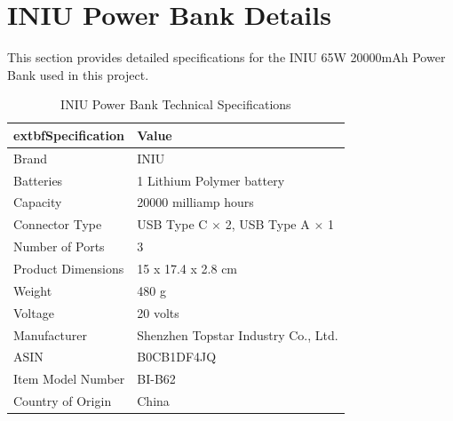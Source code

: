 \section{INIU Power Bank Details}\label{sec:iniu_details}
This section provides detailed specifications for the INIU 65W 20000mAh Power Bank used in this project.
\begin{table}[htbp]
	\centering
	\caption{INIU Power Bank Technical Specifications}
	\label{tab:iniu_power_bank_specs}
	\begin{tabular}{|l|l|}
		\hline
			extbf{Specification} & \textbf{Value} \\
		\hline
		Brand & INIU \\
		\hline
		Batteries & 1 Lithium Polymer battery \\
		\hline
		Capacity & 20000 milliamp hours \\
		\hline
		Connector Type & USB Type C $\times$ 2, USB Type A $\times$ 1 \\
		\hline
		Number of Ports & 3 \\
		\hline
		Product Dimensions & 15 x 17.4 x 2.8 cm \\
		\hline
		Weight & 480 g \\
		\hline
		Voltage & 20 volts \\
		\hline
		Manufacturer & Shenzhen Topstar Industry Co., Ltd. \\
		\hline
		ASIN & B0CB1DF4JQ \\
		\hline
		Item Model Number & BI-B62 \\
		\hline
		Country of Origin & China \\
		\hline
	\end{tabular}
\end{table}

